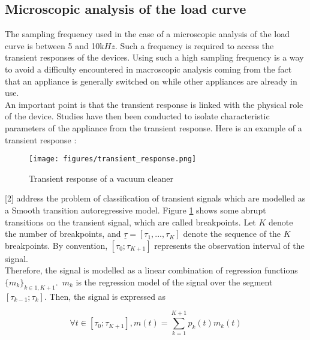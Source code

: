 
\subsection{Microscopic analysis of the load curve}
The sampling frequency used in the case of a microscopic analysis of the load curve is between 5 and 10k$Hz$. Such a frequency is required to access the transient responses of the devices. Using such a high sampling frequency is a way to avoid a difficulty encountered in macroscopic analysis coming from the fact that an appliance is generally switched on while other appliances are already in use. 
\\

An important point is that the transient response is linked with the physical role of the device. Studies have then been conducted to isolate characteristic parameters of the appliance from the transient response. Here is an example of a transient response :
\\

\begin{figure}[H]
\centering
\texttt{[image: figures/transient\_response.png]}
\caption{Transient response of a vacuum cleaner}
\label{fig:transient_response}
\end{figure}


[2] address the problem of classification of transient signals which are modelled as a Smooth transition autoregressive model. Figure \ref{fig:transient_response} shows some abrupt transitions on the transient signal, which are called breakpoints. Let $K$ denote the number of breakpoints, and $\underline{\tau} = [\tau_1,...,\tau_K]$ denote the sequence of the $K$ breakpoints. By convention, $[\tau_0;\tau_{K+1}]$ represents the observation interval of the signal. 
\\

 Therefore, the signal is modelled as a linear combination of regression functions $\{m_k\}_{k\in{1,K+1}}$.~$m_k$ is the regression model of the signal over the segment $[\tau_{k-1};\tau_{k}]$. Then, the signal is expressed as

\begin{equation}
\forall t\in [\tau_0;\tau_{K+1}],m(t)= \sum_{k=1}^{K+1}p_k(t)m_k(t)
\end{equation}

